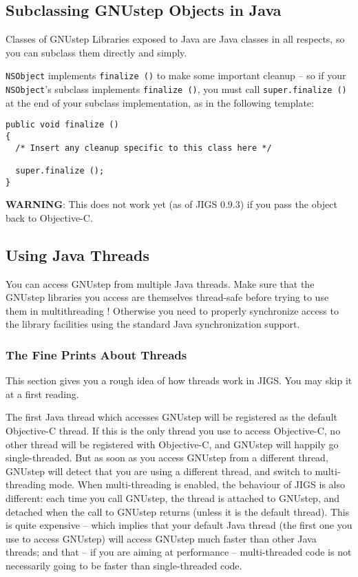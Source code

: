 \subsection{Subclassing GNUstep Objects in Java}

Classes of GNUstep Libraries exposed to Java are Java classes in all
respects, so you can subclass them directly and simply.  

\texttt{NSObject} implements \texttt{finalize ()} to make some important 
cleanup -- so if your \texttt{NSObject}'s subclass implements
\texttt{finalize ()}, you must call \texttt{super.finalize ()} 
at the end of your subclass implementation, as in the following template:
\begin{verbatim}
public void finalize ()
{
  /* Insert any cleanup specific to this class here */

  super.finalize ();
}
\end{verbatim}

{\bf WARNING}: This does not work yet (as of JIGS 0.9.3) if you pass
the object back to Objective-C.

\subsection{Using Java Threads}

You can access GNUstep from multiple Java threads.  Make sure that the
GNUstep libraries you access are themselves thread-safe before trying
to use them in multithreading !  Otherwise you need to properly
synchronize access to the library facilities using the standard Java
synchronization support.

\subsubsection{The Fine Prints About Threads}

This section gives you a rough idea of how threads work in JIGS.  You
may skip it at a first reading.

The first Java thread which accesses GNUstep will be registered as the
default Objective-C thread.  If this is the only thread you use to
access Objective-C, no other thread will be registered with
Objective-C, and GNUstep will happily go single-threaded.  But as soon
as you access GNUstep from a different thread, GNUstep will detect
that you are using a different thread, and switch to multi-threading
mode.  When multi-threading is enabled, the behaviour of JIGS is also
different: each time you call GNUstep, the thread is attached to
GNUstep, and detached when the call to GNUstep returns (unless it is
the default thread).  This is quite expensive -- which implies that
your default Java thread (the first one you use to access GNUstep)
will access GNUstep much faster than other Java threads; and that -- if
you are aiming at performance -- multi-threaded code is not
necessarily going to be faster than single-threaded code.

